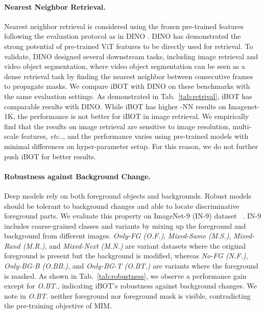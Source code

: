 \documentclass{article} \usepackage{iclr2022_conference,times}
\makeatletter
\def\vs{{\bm{s}}}
\def\ourmethod{{iBOT}\xspace}
\DeclareRobustCommand\onedot{\futurelet\@let@token\@onedot}
\def\@onedot{\ifx\@let@token.\else.\null\fi\xspace}
\def\etc{\emph{etc}\onedot} \def\vs{\emph{vs}\onedot}
\makeatother
\begin{document}
\paragraph{Nearest Neighbor Retrieval.} 
Nearest neighbor retrieval is considered using the frozen pre-trained features following the evaluation protocol as in DINO \citep{dino}. 
DINO has demonstrated the strong potential of pre-trained ViT features to be directly used for retrieval. To validate, DINO designed several downstream tasks, including image retrieval and video object segmentation, where video object segmentation can be seen as a dense retrieval task by finding the nearest neighbor between consecutive frames to propagate masks.
We compare \ourmethod with DINO on these benchmarks with the same evaluation settings. 
As demonstrated in Tab.~\ref{tab:retrival}, \ourmethod has comparable results with DINO. While \ourmethod has higher -NN results on Imagenet-1K, the performance is not better for \ourmethod in image retrieval. We empirically find that the results on image retrieval are sensitive to image resolution, multi-scale features, \etc, and the performance varies using pre-trained models with minimal differences on hyper-parameter setup. For this reason, we do not further push \ourmethod for better results.

\paragraph{Robustness against Background Change.} 
Deep models rely on both foreground objects and backgrounds. Robust models should be tolerant to background changes and able to locate discriminative foreground parts.
We evaluate this property on ImageNet-9 (IN-9) dataset~ \citep{bgchallenge}. IN-9 includes  coarse-grained classes and  variants by mixing up the foreground and background from different images. 
\textit{Only-FG (O.F.)}, \textit{Mixed-Same (M.S.)}, \textit{Mixed-Rand (M.R.)}, and \textit{Mixed-Next (M.N.)} are  variant datasets where the original foreground is present but the background is modified, whereas \textit{No-FG (N.F.)}, \textit{Only-BG-B (O.BB.)}, and \textit{Only-BG-T (O.BT.)} are  variants where the foreground is masked.
As shown in Tab.~\ref{tab:robustness}, we observe a performance gain except for \textit{O.BT.}, indicating \ourmethod's robustness against background changes. We note in \textit{O.BT.} neither foreground nor foreground mask is visible, contradicting the pre-training objective of MIM.
\end{document}
